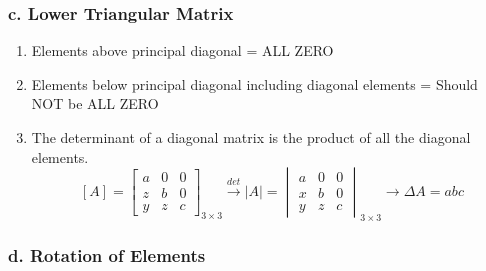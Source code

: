\subsubsection*{c. Lower Triangular Matrix}

\begin{enumerate}
    \item Elements above principal diagonal = ALL ZERO

    \item Elements below principal diagonal including diagonal elements = Should NOT be ALL ZERO

    \item The determinant of a diagonal matrix is the product of all the diagonal elements.
    $$  [A] = \begin{bmatrix}
        a & 0 & 0 \\
        z & b & 0 \\
        y & z & c
        \end{bmatrix}_{3 \times 3} \xrightarrow{det}
        |A| = \begin{vmatrix}
        a & 0 & 0 \\
        x & b & 0 \\
        y & z & c
        \end{vmatrix}_{3 \times 3} \xrightarrow{}
        \Delta A = abc
    $$
\end{enumerate}

\subsubsection*{d. Rotation of Elements}

